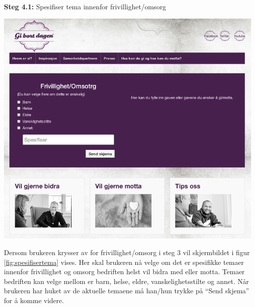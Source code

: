 {\bf Steg 4.1:} Spesifiser tema innenfor frivillighet/omsorg
\begin{center}
\includegraphics[clip=true, width=1 \textwidth,
trim=0cm 0cm 0cm 0cm]{spesifisertema.png}
\label{fig:spesifisertema}
\end{center}

Dersom brukeren krysser av for frivillighet/omsorg i steg 3 vil skjermbildet i figur \ref{fig:spesifisertema} vises. Her skal brukeren nå velge om det er spesifikke temaer innenfor frivillighet og omsorg bedriften helst vil bidra med eller motta. Temaer bedriften kan velge mellom er barn, helse, eldre, vanskelighetsstilte og annet. Når brukeren har huket av de aktuelle temaene må han/hun trykke på “Send skjema” for å komme videre.\\

